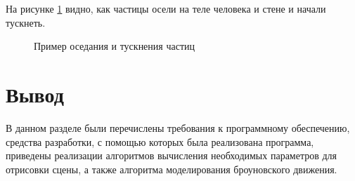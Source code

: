 На рисунке \ref{fig:virus_settled} видно, как частицы осели на теле человека и стене и начали тускнеть.

\begin{figure}[ph!]
	\caption{Пример оседания и тускнения частиц}
	\label{fig:virus_settled}
\end{figure}

\section*{Вывод}
В данном разделе были перечислены требования к программному обеспечению, средства разработки, с помощью которых была реализована программа, приведены реализации алгоритмов вычисления необходимых параметров для отрисовки сцены, а также алгоритма моделирования броуновского движения.


